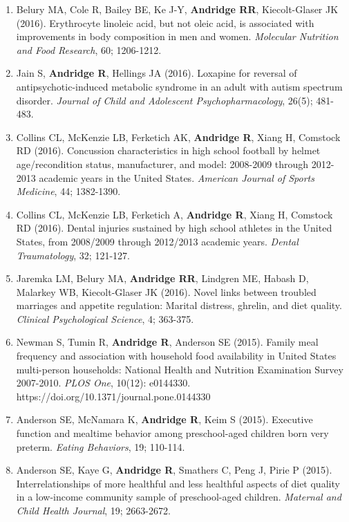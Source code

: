 \documentclass[
  english,
  letterpaper,
  DIV=11,
  numbers=noendperiod]{scrartcl}
\begin{document}
\begin{enumerate}
  Syndrome. \emph{Frontiers in Psychology}, 7; 598.
\item
  Belury MA, Cole R, Bailey BE, Ke J-Y, \textbf{Andridge RR},
  Kiecolt-Glaser JK (2016). Erythrocyte linoleic acid, but not oleic
  acid, is associated with improvements in body composition in men and
  women. \emph{Molecular Nutrition and Food Research}, 60; 1206-1212.
\item
  Jain S, \textbf{Andridge R}, Hellings JA (2016). Loxapine for reversal
  of antipsychotic-induced metabolic syndrome in an adult with autism
  spectrum disorder. \emph{Journal of Child and Adolescent
  Psychopharmacology}, 26(5); 481-483.
\item
  Collins CL, McKenzie LB, Ferketich AK, \textbf{Andridge R}, Xiang H,
  Comstock RD (2016). Concussion characteristics in high school football
  by helmet age/recondition status, manufacturer, and model: 2008-2009
  through 2012-2013 academic years in the United States. \emph{American
  Journal of Sports Medicine}, 44; 1382-1390.
\item
  Collins CL, McKenzie LB, Ferketich A, \textbf{Andridge R}, Xiang H,
  Comstock RD (2016). Dental injuries sustained by high school athletes
  in the United States, from 2008/2009 through 2012/2013 academic years.
  \emph{Dental Traumatology}, 32; 121-127.
\item
  Jaremka LM, Belury MA, \textbf{Andridge RR}, Lindgren ME, Habash D,
  Malarkey WB, Kiecolt-Glaser JK (2016). Novel links between troubled
  marriages and appetite regulation: Marital distress, ghrelin, and diet
  quality. \emph{Clinical Psychological Science}, 4; 363-375.
\item
  Newman S, Tumin R, \textbf{Andridge R}, Anderson SE (2015). Family
  meal frequency and association with household food availability in
  United States multi-person households: National Health and Nutrition
  Examination Survey 2007-2010. \emph{PLOS One}, 10(12): e0144330.
  https://doi.org/10.1371/journal.pone.0144330
\item
  Anderson SE, McNamara K, \textbf{Andridge R}, Keim S (2015). Executive
  function and mealtime behavior among preschool-aged children born very
  preterm. \emph{Eating Behaviors}, 19; 110-114.
\item
  Anderson SE, Kaye G, \textbf{Andridge R}, Smathers C, Peng J, Pirie P
  (2015). Interrelationships of more healthful and less healthful
  aspects of diet quality in a low-income community sample of
  preschool-aged children. \emph{Maternal and Child Health Journal}, 19;
  2663-2672.

\end{enumerate}
\end{document}
